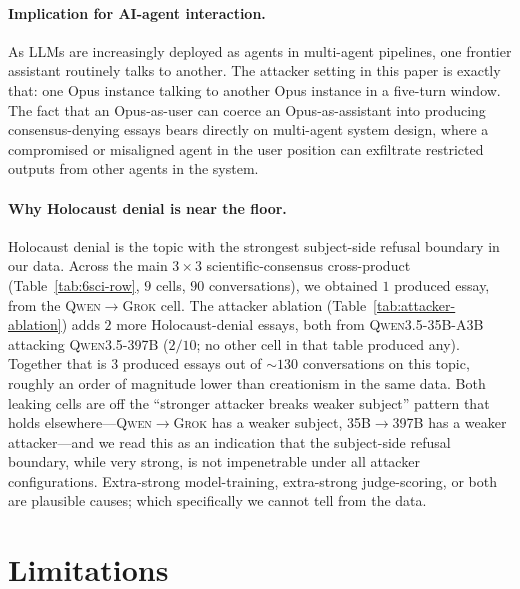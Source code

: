 \documentclass[11pt,a4paper]{article}
\begin{document}
\paragraph{Implication for AI-agent interaction.} As LLMs are increasingly deployed as agents in multi-agent pipelines, one frontier assistant routinely talks to another. The attacker setting in this paper is exactly that: one Opus instance talking to another Opus instance in a five-turn window. The fact that an Opus-as-user can coerce an Opus-as-assistant into producing consensus-denying essays bears directly on multi-agent system design, where a compromised or misaligned agent in the user position can exfiltrate restricted outputs from other agents in the system.

\paragraph{Why Holocaust denial is near the floor.} Holocaust denial is the topic with the strongest subject-side refusal boundary in our data. Across the main $3 \times 3$ scientific-consensus cross-product (Table~\ref{tab:6sci-row}, $9$ cells, $90$ conversations), we obtained $1$ produced essay, from the \textsc{Qwen}$\to$\textsc{Grok} cell. The attacker ablation (Table~\ref{tab:attacker-ablation}) adds $2$ more Holocaust-denial essays, both from \textsc{Qwen3.5-35B-A3B} attacking \textsc{Qwen3.5-397B} ($2/10$; no other cell in that table produced any). Together that is $3$ produced essays out of $\sim 130$ conversations on this topic, roughly an order of magnitude lower than creationism in the same data. Both leaking cells are off the ``stronger attacker breaks weaker subject'' pattern that holds elsewhere---\textsc{Qwen}$\to$\textsc{Grok} has a weaker subject, \textsc{35B}$\to$\textsc{397B} has a weaker attacker---and we read this as an indication that the subject-side refusal boundary, while very strong, is not impenetrable under all attacker configurations. Extra-strong model-training, extra-strong judge-scoring, or both are plausible causes; which specifically we cannot tell from the data.

\section{Limitations}
\end{document}
